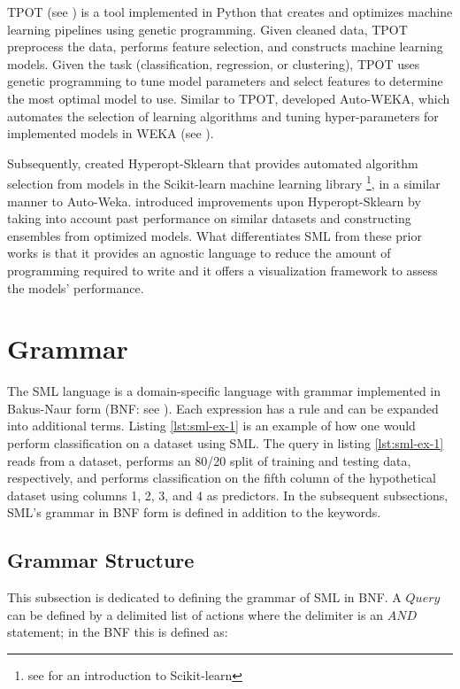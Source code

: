TPOT (see \cite{TPOT}) is a tool implemented in Python that creates and optimizes machine learning pipelines using genetic programming.  Given cleaned data,  TPOT  preprocess the data,  performs feature selection,  and constructs machine learning models.  Given the task (classification,  regression,  or clustering), TPOT uses genetic programming to tune model parameters and select features to determine the most optimal model to use.  Similar to TPOT, \cite{kotthoff_auto_2019} developed Auto-WEKA, which automates the selection of learning algorithms and tuning hyper-parameters for implemented models in WEKA  (see \cite{frank2005weka}).   

Subsequently, \cite{komer_hyperopt_2019} created Hyperopt-Sklearn that provides automated algorithm selection from models in the Scikit-learn machine learning library \footnote{see \cite{scikit-learn} for an introduction to Scikit-learn}, in a similar manner to Auto-Weka.  \cite{feurer_auto_2018} introduced improvements upon Hyperopt-Sklearn by taking into account past performance on similar datasets and constructing ensembles from optimized models.  What differentiates SML from these prior works is that it provides an agnostic language to reduce the amount of programming required to write and it offers a visualization framework to assess the models' performance.

\section{Grammar}
\label{grammar}

The SML language is a domain-specific language with grammar implemented in Bakus-Naur form (BNF: see \cite{Backus59}).  Each expression has a rule and can be expanded into additional terms.  Listing \ref{lst:sml-ex-1} is an example of how one would perform classification on a dataset using SML. The query in listing \ref{lst:sml-ex-1} reads from a dataset, performs an 80/20 split of training and testing data, respectively, and performs classification on the fifth column of the hypothetical dataset using columns 1, 2, 3, and 4 as predictors. In the subsequent subsections, SML's grammar in BNF form is defined in addition to the keywords.

\subsection{Grammar Structure}
This subsection is dedicated to defining the grammar of SML in BNF.  A \(Query\) can be defined by a delimited list of actions where the delimiter is an \(AND\) statement; in the BNF this is defined as:

